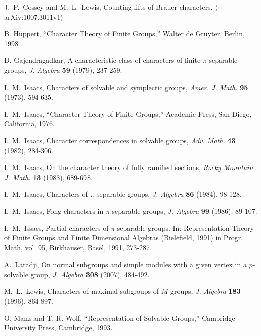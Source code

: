 \documentclass[12pt]{article}
\begin{document}
\begin{thebibliography}{99}

 J.~P.~Cossey and M.~L.~Lewis, Counting lifts of
        Brauer characters, $\langle$arXiv:1007.3011v1$\rangle$

 B. Huppert, ``Character Theory of Finite Groups,''
         Walter de Gruyter, Berlin, 1998.

 D. Gajendragadkar, A characteristic class of
    characters of finite $\pi$-separable groups,
    {\it J. Algebra} {\bf 59} (1979), 237-259.

   I.~M.~Isaacs, Characters of solvable and symplectic groups,
                  {\it Amer. J. Math.} {\bf 95} (1973), 594-635.

    I.~M.~Isaacs, ``Character Theory of Finite
        Groups,'' Academic Press, San Diego, California, 1976.

  I.~M.~Isaacs, Character correspondences in
                  solvable groups, {\it Adv. Math.} {\bf 43} (1982),
                  284-306.

    I.~M.~Isaacs, On the character theory of fully ramified sections,
                  {\it Rocky Mountain J. Math.} {\bf 13} (1983),
                  689-698.

   I.~M.~Isaacs, Characters of $\pi$-separable groups,
                  {\it J. Algebra} {\bf 86} (1984), 98-128.

    I.~M.~Isaacs, Fong characters in $\pi$-separable
        groups, {\it J. Algebra} {\bf 99} (1986), 89-107.

  I.~M.~Issacs, Partial characters of $\pi$-separable
        groups.  In: Representation Theory of Finite Groups
        and Finite Dimensional Algebras (Bielefield, 1991) in Progr. Math,
        vol. 95, Birkhauser, Basel, 1991, 273-287.

 A.~Laradji, On normal subgroups and simple modules
        with a given vertex in a $p$-solvable group, {\it J. Algebra}
        {\bf 308} (2007), 484-492.

    M.~L.~Lewis, Characters of maximal subgroups of
       $M$-groups, {\it J. Algebra} {\bf 183} (1996), 864-897.

 O. Manz and T. R. Wolf, ``Representation of Solvable
        Groups,'' Cambridge University Press, Cambridge, 1993.

\end{thebibliography}
\end{document}
